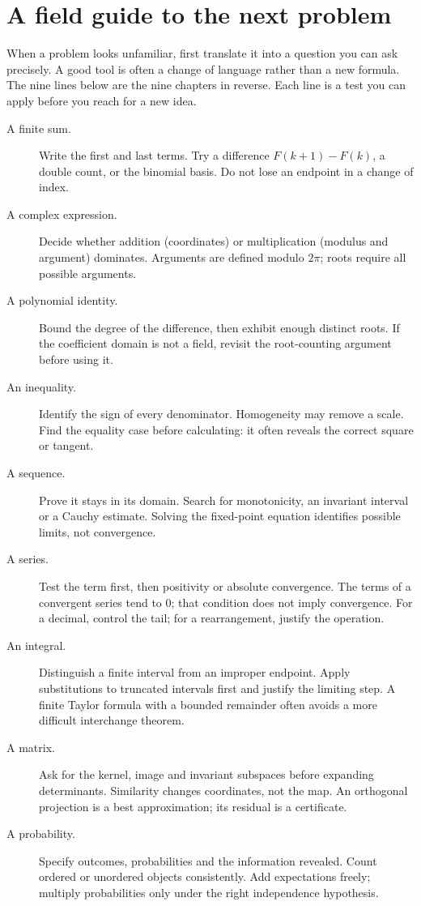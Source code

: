 \chapter*{A field guide to the next problem}
When a problem looks unfamiliar, first translate it into a question you can ask precisely. A good tool is often a change of language rather than a new formula. The nine lines below are the nine chapters in reverse. Each line is a test you can apply before you reach for a new idea.

\begin{description}
\item[A finite sum.] Write the first and last terms. Try a difference $F(k+1)-F(k)$, a double count, or the binomial basis. Do not lose an endpoint in a change of index.
\item[A complex expression.] Decide whether addition (coordinates) or multiplication (modulus and argument) dominates. Arguments are defined modulo $2\pi$; roots require all possible arguments.
\item[A polynomial identity.] Bound the degree of the difference, then exhibit enough distinct roots. If the coefficient domain is not a field, revisit the root-counting argument before using it.
\item[An inequality.] Identify the sign of every denominator. Homogeneity may remove a scale. Find the equality case before calculating: it often reveals the correct square or tangent.
\item[A sequence.] Prove it stays in its domain. Search for monotonicity, an invariant interval or a Cauchy estimate. Solving the fixed-point equation identifies possible limits, not convergence.
\item[A series.] Test the term first, then positivity or absolute convergence. The terms of a convergent series tend to $0$; that condition does not imply convergence. For a decimal, control the tail; for a rearrangement, justify the operation.
\item[An integral.] Distinguish a finite interval from an improper endpoint. Apply substitutions to truncated intervals first and justify the limiting step. A finite Taylor formula with a bounded remainder often avoids a more difficult interchange theorem.
\item[A matrix.] Ask for the kernel, image and invariant subspaces before expanding determinants. Similarity changes coordinates, not the map. An orthogonal projection is a best approximation; its residual is a certificate.
\item[A probability.] Specify outcomes, probabilities and the information revealed. Count ordered or unordered objects consistently. Add expectations freely; multiply probabilities only under the right independence hypothesis.
\end{description}

